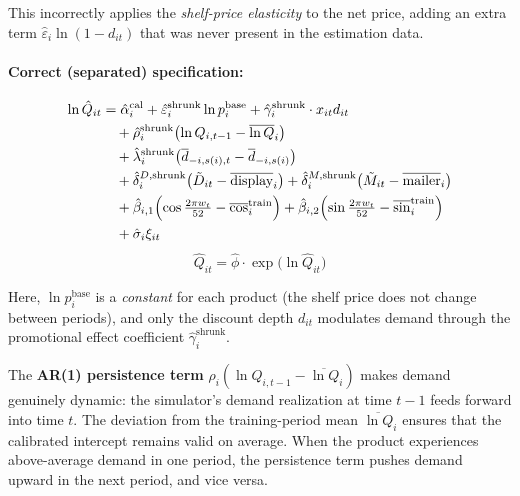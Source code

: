 \documentclass[12pt,a4paper]{article}
\begin{document}
This incorrectly applies the \emph{shelf-price elasticity} to the
net price, adding an extra term
$\hat{\varepsilon}_i \ln(1 - d_{it})$ that was never present in
the estimation data.

\paragraph{Correct (separated) specification:}
\begin{align}
\label{eq:sim-demand}
\ln \hat{Q}_{it} &= \hat{\alpha}_i^{\text{cal}}
+ \hat{\varepsilon}_i^{\text{shrunk}} \ln p_i^{\text{base}}
+ \hat{\gamma}_i^{\text{shrunk}} \cdot x_{it} d_{it}
\nonumber \\
&\quad + \hat{\rho}_i^{\text{shrunk}}
  \bigl(\ln Q_{i,t-1} - \overline{\ln Q}_i\bigr)
\nonumber \\
&\quad + \hat{\lambda}_i^{\text{shrunk}}
  \bigl(\overline{d}_{-i,s(i),t} - \overline{d}_{-i,s(i)}\bigr)
\nonumber \\
&\quad + \hat{\delta}_i^{D,\text{shrunk}}
  \bigl(\tilde{D}_{it} - \overline{\text{display}}_i\bigr)
+ \hat{\delta}_i^{M,\text{shrunk}}
  \bigl(\tilde{M}_{it} - \overline{\text{mailer}}_i\bigr)
\nonumber \\
&\quad + \hat{\beta}_{i,1}
  \Bigl(\cos\tfrac{2\pi w_t}{52}
        - \overline{\cos}_i^{\text{train}}\Bigr)
+ \hat{\beta}_{i,2}
  \Bigl(\sin\tfrac{2\pi w_t}{52}
        - \overline{\sin}_i^{\text{train}}\Bigr)
\nonumber \\
&\quad + \hat{\sigma}_i \xi_{it}
\end{align}
\begin{equation}
\hat{Q}_{it} = \hat{\phi} \cdot
\exp\bigl(\ln \hat{Q}_{it}\bigr)
\end{equation}

Here, $\ln p_i^{\text{base}}$ is a \emph{constant} for each product
(the shelf price does not change between periods), and only the
discount depth $d_{it}$ modulates demand through the promotional
effect coefficient $\hat{\gamma}_i^{\text{shrunk}}$.

The \textbf{AR(1) persistence term}
$\hat{\rho}_i (\ln Q_{i,t-1} - \overline{\ln Q}_i)$ makes demand
genuinely dynamic: the simulator's demand realization at time $t-1$
feeds forward into time $t$. The deviation from the training-period
mean $\overline{\ln Q}_i$ ensures that the calibrated intercept
remains valid on average. When the product experiences above-average
demand in one period, the persistence term pushes demand upward in
the next period, and vice versa.
\end{document}
